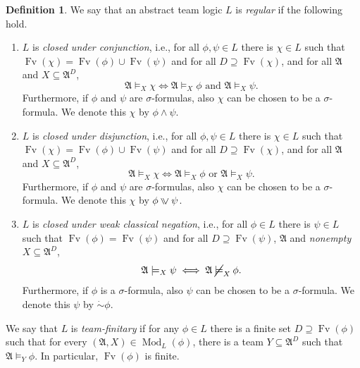 \documentclass[a4paper]{amsart}
\theoremstyle{definition}
\newtheorem{definition}{Definition}[section]
\theoremstyle{remark}
\renewcommand{\restriction}{ {\upharpoonright} }
\newcommand{\A}{\mathcal{A}}
\DeclareMathOperator{\Fv}{Fv}
\newcommand\ivee{\mathrel{\rotatebox[origin=c]{270}{$\geqslant$}}}
\newcommand{\cneg}{\mathord{\dot{\sim}}}
\newcommand\nmodels{\mathbin{\cancel{\models}}}
\theoremstyle{definition}
\renewcommand{\A}{\mathfrak{A}}
\DeclareMathOperator{\Mod}{Mod}
\begin{document}
\begin{definition}
    We say that an abstract team logic $L$ is \emph{regular} if the following hold.
    \begin{enumerate}
        \item $L$ is \emph{closed under conjunction}, i.e., for all $\phi,\psi\in L$ there is $\chi\in L$ such that $\Fv(\chi)=\Fv(\phi)\cup\Fv(\psi)$ and for all $D\supseteq\Fv(\chi)$, and for all $\A$ and $X\subseteq\A^D$,
        \[
            \A\models_X\chi \iff \text{$\A\models_X\phi$ and $\A\models_X\psi$}.
        \]
        Furthermore, if $\phi$ and $\psi$ are $\sigma$-formulas, also $\chi$ can be chosen to be a $\sigma$-formula. We denote this $\chi$ by $\phi\land\psi$. 

        \item $L$ is \emph{closed under disjunction}, i.e., for all $\phi,\psi\in L$ there is $\chi\in L$ such that $\Fv(\chi)=\Fv(\phi)\cup\Fv(\psi)$ and for all $D\supseteq\Fv(\chi)$, and for all $\A$ and $X\subseteq\A^D$,
        \[
            \A\models_X\chi \iff \text{$\A\models_X\phi$ or $\A\models_X\psi$}.
        \]
        Furthermore, if $\phi$ and $\psi$ are $\sigma$-formulas, also $\chi$ can be chosen to be a $\sigma$-formula. We denote this $\chi$ by $\phi\ivee\psi$. 

        \item\label{closure under classical negation} $L$ is \emph{closed under weak classical negation}, i.e., for all $\phi\in L$ there is $\psi\in L$ such that $\Fv(\phi)=\Fv(\psi)$ and for all $D\supseteq\Fv(\psi)$, $\A$ and \emph{nonempty} $X\subseteq\A^D$,
        \[
            \A\models_X\psi \iff \A\nmodels_X\phi.
        \]
        Furthermore, if $\phi$ is a $\sigma$-formula, also $\psi$ can be chosen to be a $\sigma$-formula. We denote this $\psi$ by $\cneg\phi$.
    \end{enumerate}

    
    We say that $L$ is \emph{team-finitary} if for any $\phi\in L$ there is a finite set $D\supseteq\Fv(\phi)$ such that for every $(\A,X)\in\Mod_L(\phi)$, there is a team $Y\subseteq\A^D$ such that
    $\A\models_Y\phi$.
    In particular, $\Fv(\phi)$ is finite.
\end{definition}
\end{document}
